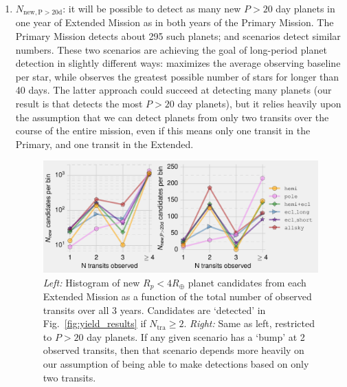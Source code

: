\begin{enumerate}
	\item $N_\mathrm{new,P>20d}$: it will be possible to detect as many new 
	$P>20$ day planets in one year of \tesss Extended Mission as in both years 
	of the Primary Mission.
	The Primary Mission detects about 295 such planets; \hemis\:and 
	\npole\:scenarios detect similar numbers.
	These two scenarios are achieving the goal of long-period planet detection 
	in slightly different ways: %
	\npole\:maximizes the average observing baseline per star, while 
	\hemis\:observes the greatest possible number of stars for longer than 40 
	days.
	The latter approach could succeed at detecting many planets (our result is 
	that \hemis\:detects the most $P>20$ day planets), but it relies heavily 
	upon the assumption that we can detect planets from only two transits over 
	the course of the entire mission, even if this means only one transit in 
	the Primary, and one transit in the Extended.
	\begin{figure}[!t]
		\centering
		\includegraphics{figures/Ntra_histogram_nogap.pdf}
		\caption{ \textit{Left:} Histogram of new $R_p<4R_\oplus$ planet 
			candidates from each Extended Mission as a function of the 
			total number of 
			observed transits over all 3 years.
			Candidates are `detected' in 
			Fig.~\protect\ref{fig:yield_results} if $N_\mathrm{tra}\geq2$.
			\textit{Right:} Same as left, restricted to $P>20$ day planets.
			If any given scenario has a `bump' at 2 observed transits, then 
			that scenario depends more heavily on our assumption of being 
			able to make detections based on only two transits.
}
\end{figure}
\end{enumerate}
